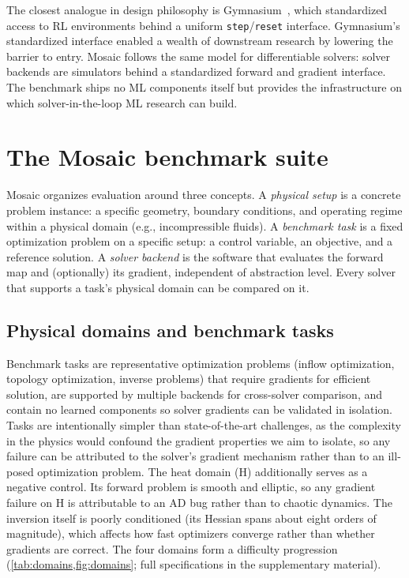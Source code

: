 \documentclass{article}
\begin{document}
The closest analogue in design philosophy is Gymnasium~\cite{brockman2016openai}, which standardized access to RL
environments behind a uniform \texttt{step}/\texttt{reset} interface.
Gymnasium's standardized interface enabled a
wealth of downstream research by lowering the barrier to entry.
Mosaic follows the same model for differentiable solvers: solver
backends are simulators behind a standardized forward and gradient interface.
The benchmark ships no ML components itself but provides the
infrastructure on which solver-in-the-loop ML research can build.

\section{The Mosaic benchmark suite}
\label{sec:mosaic}

Mosaic organizes evaluation around three concepts. A \emph{physical
setup} is a concrete problem instance: a specific geometry, boundary
conditions, and operating regime within a physical domain (e.g.,
incompressible fluids). A \emph{benchmark task} is a fixed optimization
problem on a specific setup: a control variable, an objective, and a
reference solution. A \emph{solver backend} is
the software that evaluates the forward map and (optionally) its
gradient, independent of abstraction level. Every solver that supports a
task's physical domain can be compared on it.


\subsection{Physical domains and benchmark tasks}
\label{sec:domains}

Benchmark tasks are representative optimization problems (inflow
optimization, topology optimization, inverse problems) that require
gradients for efficient solution, are supported by multiple backends
for cross-solver comparison, and contain no learned components so solver
gradients can be validated in isolation. Tasks are intentionally simpler
than state-of-the-art challenges, as the complexity in the physics would
confound the gradient properties we aim to isolate, so any failure can
be attributed to the solver's gradient mechanism rather than to an
ill-posed optimization problem. The heat domain (H) additionally serves
as a negative control. Its forward problem is smooth and elliptic, so
any gradient failure on H is attributable to an AD bug rather than to
chaotic dynamics. The inversion itself is poorly conditioned (its
Hessian spans about eight orders of magnitude), which affects how fast
optimizers converge rather than whether gradients are correct.
The four domains form a difficulty progression
(\cref{tab:domains,fig:domains}; full specifications in the
supplementary material).
\end{document}
